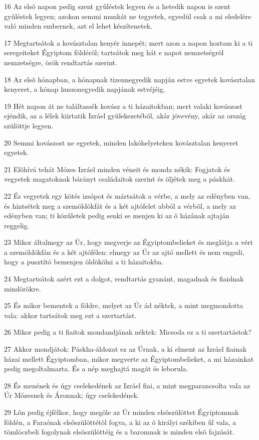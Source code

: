 \par 16 Az elsõ napon pedig szent gyûléstek legyen és a hetedik napon is szent gyûléstek legyen; azokon semmi munkát ne tegyetek, egyedül csak a mi eledelére való minden embernek, azt el lehet készítenetek.
\par 17 Megtartsátok a kovásztalan kenyér innepét; mert azon a napon hoztam ki a ti seregeiteket Égyiptom földérõl; tartsátok meg hát e napot nemzetségrõl nemzetségre, örök rendtartás szerint.
\par 18 Az elsõ hónapban, a hónapnak tizennegyedik napján estve egyetek kovásztalan kenyeret, a hónap huszonegyedik napjának estvéjéig.
\par 19 Hét napon át ne találtassék kovász a ti házaitokban; mert valaki kovászost ejéndik, az a lélek kiirtatik Izráel gyülekezetébõl, akár jövevény, akár az ország szülöttje legyen.
\par 20 Semmi kovászost ne egyetek, minden lakóhelyeteken kovásztalan kenyeret egyetek.
\par 21 Elõhívá tehát Mózes Izráel minden véneit és monda nékik: Fogjatok és vegyetek magatoknak bárányt családaitok szerint és öljétek meg a páskhát.
\par 22 És vegyetek egy kötés izsópot és mártsátok a vérbe, a mely az edényben van, és hintsétek meg a szemöldökfát és a két ajtófelet abból a vérbõl, a mely az edényben van; ti közûletek pedig senki se menjen ki az õ házának ajtaján reggelig.
\par 23 Mikor általmegy az Úr, hogy megverje az Égyiptombelieket és meglátja a vért a szemöldökfán és a két ajtófélen: elmegy az Úr az ajtó mellett és nem engedi, hogy a pusztító bemenjen öldökölni a ti házaitokba.
\par 24 Megtartsátok azért ezt a dolgot, rendtartás gyanánt, magadnak és fiaidnak mindörökre.
\par 25 És mikor bementek a földre, melyet az Úr ád néktek, a mint megmondotta vala: akkor tartsátok meg ezt a szertartást.
\par 26 Mikor pedig a ti fiaitok mondandjának néktek: Micsoda ez a ti szertartástok?
\par 27 Akkor mondjátok: Páskha-áldozat ez az Úrnak, a ki elment az Izráel fiainak házai mellett Égyiptomban, mikor megverte az Égyiptombelieket, a mi házainkat pedig megoltalmazta. És a nép meghajtá magát és leborula.
\par 28 És menének és úgy cselekedének az Izráel fiai, a mint megparancsolta vala az Úr Mózesnek és Áronnak; úgy cselekedének.
\par 29 Lõn pedig éjfélkor, hogy megöle az Úr minden elsõszülöttet Égyiptomnak földén, a Faraónak elsõszülöttétõl fogva, a ki az õ királyi székiben ûl vala, a tömlöczbeli fogolynak elsõszülöttéig és a baromnak is minden elsõ fajzását.
